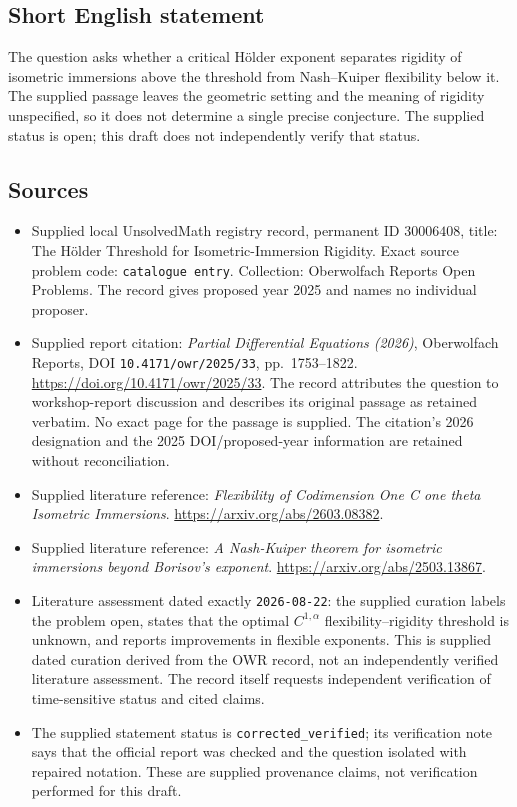 \documentclass[11pt]{article}
\begin{document}
\subsection{Short English statement}
The question asks whether a critical H\"older exponent separates rigidity of isometric immersions above the threshold from Nash--Kuiper flexibility below it. The supplied passage leaves the geometric setting and the meaning of rigidity unspecified, so it does not determine a single precise conjecture. The supplied status is open; this draft does not independently verify that status.
\subsection{Sources}
\begin{itemize}
\item Supplied local UnsolvedMath registry record, permanent ID \(30006408\), title: The H\"older Threshold for Isometric-Immersion Rigidity. Exact source problem code: \texttt{catalogue entry}. Collection: Oberwolfach Reports Open Problems. The record gives proposed year 2025 and names no individual proposer.
\item Supplied report citation: \emph{Partial Differential Equations (2026)}, Oberwolfach Reports, DOI \texttt{10.4171/owr/2025/33}, pp.\ 1753--1822. \url{https://doi.org/10.4171/owr/2025/33}. The record attributes the question to workshop-report discussion and describes its original passage as retained verbatim. No exact page for the passage is supplied. The citation's 2026 designation and the 2025 DOI/proposed-year information are retained without reconciliation.
\item Supplied literature reference: \emph{Flexibility of Codimension One C one theta Isometric Immersions}. \url{https://arxiv.org/abs/2603.08382}.
\item Supplied literature reference: \emph{A Nash-Kuiper theorem for isometric immersions beyond Borisov's exponent}. \url{https://arxiv.org/abs/2503.13867}.
\item Literature assessment dated exactly \texttt{2026-08-22}: the supplied curation labels the problem open, states that the optimal \(C^{1,\alpha}\) flexibility--rigidity threshold is unknown, and reports improvements in flexible exponents. This is supplied dated curation derived from the OWR record, not an independently verified literature assessment. The record itself requests independent verification of time-sensitive status and cited claims.
\item The supplied statement status is \texttt{corrected\_verified}; its verification note says that the official report was checked and the question isolated with repaired notation. These are supplied provenance claims, not verification performed for this draft.
\end{itemize}
\end{document}
